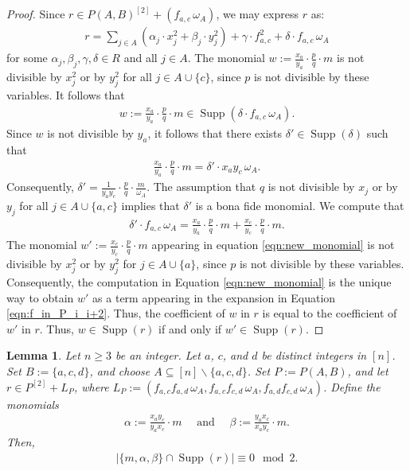 \documentclass[12pt,a4paper]{amsart}
\theoremstyle{plain}
\newtheorem{lem}[thrm]{Lemma}
\def\blem{\begin{lem}}
\def\elem{\end{lem}}
\theoremstyle{definition}
\def\bproof{\begin{proof}}
\def\eproof{\end{proof}}
\theoremstyle{remark}
\let\setminus=\smallsetminus
\DeclareMathOperator{\Supp}{Supp}
\newcommand{\card}[1]{\left \lvert #1 \right\rvert}
\renewcommand{\subset}{\subseteq}
\begin{document}
\bproof
Since $r \in P(A,B)^{[2]} + (f_{a,c} \, \omega_{A})$, we may express $r$ as:
\begin{align}
    \label{eqn:f_in_P_i_i+2}
    r = \sum_{j \in A} (\alpha_{j} \cdot x_{j}^{2} + \beta_{j} \cdot y_{j}^{2}) + \gamma \cdot f_{a,c}^{2} + \delta \cdot f_{a,c} \, \omega_{A}
\end{align}
for some $\alpha_{j},\beta_{j},\gamma,\delta \in R$ and all $j \in A$. The monomial $w := \frac{x_{a}}{y_{a}} \cdot \frac{p}{q} \cdot m$ is not divisible by $x_{j}^{2}$ or by $y_{j}^{2}$ for all $j \in A \cup \{c\}$, since $p$ is not divisible by these variables. It follows that 
\begin{align*}
    w := \frac{x_{a}}{y_{a}} \cdot \frac{p}{q} \cdot m \in \Supp(\delta \cdot f_{a,c} \, \omega_{A}).
\end{align*}
Since $w$  is not divisible by $y_{a}$, it follows that there exists $\delta' \in \Supp(\delta)$ such that 
\begin{align*}
    \frac{x_{a}}{y_{a}} \cdot \frac{p}{q} \cdot m = \delta' \cdot  x_{a}y_{c} \, \omega_{A}.
\end{align*}
Consequently, $\delta' = \frac{1}{y_{a}y_{c}} \cdot \frac{p}{q} \cdot \frac{m}{\omega_{A}}$. The assumption that $q$ is not divisible by $x_{j}$ or by $y_{j}$ for all $j \in A \cup \{a,c\}$ implies that $\delta'$ is a bona fide monomial. We compute that
\begin{align}
    \label{eqn:new_monomial}
    \delta' \cdot f_{a,c} \, \omega_{A}
    = \frac{x_{a}}{y_{a}} \cdot \frac{p}{q} \cdot m + \frac{x_{c}}{y_{c}} \cdot \frac{p}{q} \cdot m.
\end{align}
The monomial $w' := \frac{x_{c}}{y_{c}} \cdot \frac{p}{q} \cdot m$ appearing in equation \eqref{eqn:new_monomial} is not divisible by $x_{j}^{2}$ or by $y_{j}^{2}$ for $j \in A \cup \{a\}$, since $p$ is not divisible by these variables. Consequently, the computation in Equation \eqref{eqn:new_monomial} is the unique way to obtain $w'$ as a term appearing in the expansion in Equation \eqref{eqn:f_in_P_i_i+2}. Thus, the coefficient of $w$ in $r$ is equal to the coefficient of $w'$ in $r$. Thus, $w \in \Supp(r)$ if and only if $w' \in \Supp(r)$.
\eproof


\blem
\label{lem:Jn_m_in_Supp_f}
Let $n \ge 3$ be an integer. Let $a$, $c$, and $d$ be distinct integers in $[n]$. Set $B := \{a,c,d\}$, and choose $A \subset [n] \setminus \{a,c,d\}$. Set $P := P(A,B)$, and let $r \in P^{[2]} + L_{P}$, where $L_{P} := (f_{a,c}f_{a,d}\, \omega_{A},f_{a,c}f_{c,d}\, \omega_{A},f_{a,d}f_{c,d} \, \omega_{A})$. Define the monomials 
\begin{align*}
    \alpha := \frac{x_{a}y_{c}}{y_{a}x_{c}} \cdot m  \quad \text{ and } \quad
    \beta := \frac{y_{a}x_{c}}{x_{a}y_{c}} \cdot m.
\end{align*}
Then,
\begin{align*}
    \card{\{m,\alpha,\beta\} \cap \Supp(r) } \equiv 0 \mod{2}.
\end{align*}
\elem
\end{document}
